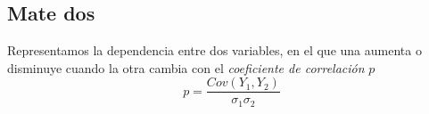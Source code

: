 \subsection{Mate dos}
Representamos la dependencia entre dos variables, en el que una aumenta o disminuye cuando la otra cambia con el \emph{coeficiente de correlación} $p$
\begin{equation}
p=\frac{Cov(Y_1,Y_2)}{\sigma_1\sigma_2}
\end{equation}